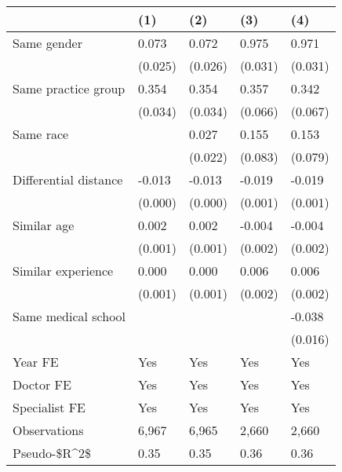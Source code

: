 \begin{tabular}{lllll}
\hline
& (1) & (2) & (3) & (4) \\ \hline
Same gender                        & 0.073   & 0.072   & 0.975   & 0.971   \\
& (0.025) & (0.026) & (0.031) & (0.031) \\
Same practice group                & 0.354   & 0.354   & 0.357   & 0.342   \\
& (0.034) & (0.034) & (0.066) & (0.067) \\
Same race                          &         & 0.027   & 0.155   & 0.153   \\
&         & (0.022) & (0.083) & (0.079) \\
Differential distance              & -0.013  & -0.013  & -0.019  & -0.019  \\
& (0.000) & (0.000) & (0.001) & (0.001) \\
Similar age                        & 0.002   & 0.002   & -0.004  & -0.004  \\
& (0.001) & (0.001) & (0.002) & (0.002) \\
Similar experience                 & 0.000   & 0.000   & 0.006   & 0.006   \\
& (0.001) & (0.001) & (0.002) & (0.002) \\
Same medical school                &         &         &         & -0.038  \\
&         &         &         & (0.016) \\
Year FE                            & Yes     & Yes     & Yes     & Yes     \\
Doctor FE                          & Yes     & Yes     & Yes     & Yes     \\
Specialist FE                      & Yes     & Yes     & Yes     & Yes     \\
Observations                       & 6,967   & 6,965   & 2,660   & 2,660   \\
Pseudo-\$R\textasciicircum{}2\$ & 0.35    & 0.35    & 0.36    & 0.36    \\
\hline
\end{tabular}
